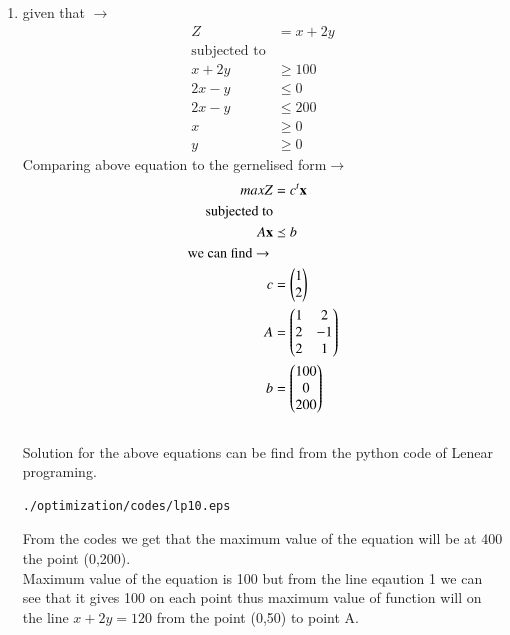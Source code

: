 \renewcommand{\theequation}{\theenumi}
\begin{enumerate}[label=\arabic*.,ref=\thesubsection.\theenumi]
\item  given that $\to$
\begin{align}
Z &= x+ 2y
\\
\text{subjected to}
\\
x + 2y &\geq 100
\\
2x - y &\leq 0
\\
2x - y &\leq 200
\\
x  &\geq 0
\\
y &\geq 0
\end{align}
Comparing above equation to the gernelised form$\to$ 
\begin{align}
maxZ &= c^t \mathbf{x}
\\
\text{subjected to}
\\
A\mathbf{x} &\preceq b
\\ 
\text{we can find $\to$ }
\\
c &= \begin{pmatrix}1\\ 2\end{pmatrix}
\\
A &= \begin{pmatrix}1 & 2\\2 & -1 \\ 2 & 1\end{pmatrix}
\\
b &= \begin{pmatrix}100\\0\\200\end{pmatrix}
\end{align}\\
Solution for the above equations can be find from the python code of Lenear programing.\\
\begin{lstlisting}
./optimization/codes/lp10.eps
\end{lstlisting}
From the codes we get that the maximum value of the equation will be  at 400 the point (0,200).\\

Maximum value of the equation is 100 but from the line  eqaution 1 we can see that  it gives 100 on each point thus maximum value of function will on the line  $x+2y = 120$ from the point (0,50) to point A.


\end{enumerate}
